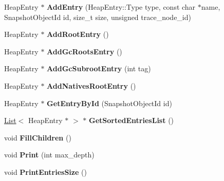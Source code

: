 \begin{DoxyCompactItemize}
\item 
\hypertarget{classv8_1_1internal_1_1_heap_snapshot_a9028b9fa71881d3260ef1b037d58d4f6}{}Heap\+Entry $\ast$ {\bfseries Add\+Entry} (Heap\+Entry\+::\+Type type, const char $\ast$name, Snapshot\+Object\+Id id, size\+\_\+t size, unsigned trace\+\_\+node\+\_\+id)\label{classv8_1_1internal_1_1_heap_snapshot_a9028b9fa71881d3260ef1b037d58d4f6}

\item 
\hypertarget{classv8_1_1internal_1_1_heap_snapshot_a5c776b850845839a7a1d2faa0ec68cda}{}Heap\+Entry $\ast$ {\bfseries Add\+Root\+Entry} ()\label{classv8_1_1internal_1_1_heap_snapshot_a5c776b850845839a7a1d2faa0ec68cda}

\item 
\hypertarget{classv8_1_1internal_1_1_heap_snapshot_a11461ab41ce2a57e6f44c0bca23811f7}{}Heap\+Entry $\ast$ {\bfseries Add\+Gc\+Roots\+Entry} ()\label{classv8_1_1internal_1_1_heap_snapshot_a11461ab41ce2a57e6f44c0bca23811f7}

\item 
\hypertarget{classv8_1_1internal_1_1_heap_snapshot_a187926be3f695d8260afce55c2888f3c}{}Heap\+Entry $\ast$ {\bfseries Add\+Gc\+Subroot\+Entry} (int tag)\label{classv8_1_1internal_1_1_heap_snapshot_a187926be3f695d8260afce55c2888f3c}

\item 
\hypertarget{classv8_1_1internal_1_1_heap_snapshot_a11a232390cf0115a975b4f0ca46979b3}{}Heap\+Entry $\ast$ {\bfseries Add\+Natives\+Root\+Entry} ()\label{classv8_1_1internal_1_1_heap_snapshot_a11a232390cf0115a975b4f0ca46979b3}

\item 
\hypertarget{classv8_1_1internal_1_1_heap_snapshot_aa8f063ba3910f5bfb9b324fc52a92cca}{}Heap\+Entry $\ast$ {\bfseries Get\+Entry\+By\+Id} (Snapshot\+Object\+Id id)\label{classv8_1_1internal_1_1_heap_snapshot_aa8f063ba3910f5bfb9b324fc52a92cca}

\item 
\hypertarget{classv8_1_1internal_1_1_heap_snapshot_a7b7b95d8cda3864b7115ca15a6fc5462}{}\hyperlink{classv8_1_1internal_1_1_list}{List}$<$ Heap\+Entry $\ast$ $>$ $\ast$ {\bfseries Get\+Sorted\+Entries\+List} ()\label{classv8_1_1internal_1_1_heap_snapshot_a7b7b95d8cda3864b7115ca15a6fc5462}

\item 
\hypertarget{classv8_1_1internal_1_1_heap_snapshot_afa5230c9502d22f7441b990892c91dd8}{}void {\bfseries Fill\+Children} ()\label{classv8_1_1internal_1_1_heap_snapshot_afa5230c9502d22f7441b990892c91dd8}

\item 
\hypertarget{classv8_1_1internal_1_1_heap_snapshot_a3c183f20e6935d16ec6a852cfb77b252}{}void {\bfseries Print} (int max\+\_\+depth)\label{classv8_1_1internal_1_1_heap_snapshot_a3c183f20e6935d16ec6a852cfb77b252}

\item 
\hypertarget{classv8_1_1internal_1_1_heap_snapshot_aceff3b1868bd174f0e80263595af8355}{}void {\bfseries Print\+Entries\+Size} ()\label{classv8_1_1internal_1_1_heap_snapshot_aceff3b1868bd174f0e80263595af8355}

\end{DoxyCompactItemize}
